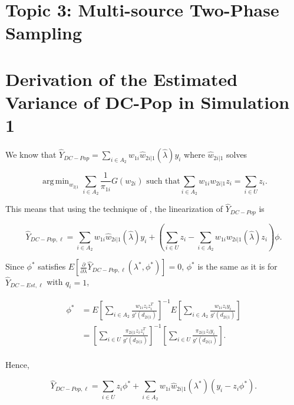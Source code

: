 \documentclass[12pt]{article}
\DeclareMathOperator*{\argmin}{arg\,min}
\begin{document}
\section{Topic 3: Multi-source Two-Phase Sampling}

\newpage 




\newpage

\appendix

\section{Derivation of the Estimated Variance of DC-Pop in Simulation 1}

We know that $\hat Y_{DC-Pop} = \sum_{i \in A_2} w_{1i} \hat w_{2i|1}(\hat
\lambda) y_i$ where $\hat w_{2i|1}$ solves

  \begin{equation}
    \argmin_{w_{2|1}} \sum_{i \in A_2} \frac{1}{\pi_{1i}} G(w_{2i})
    \text{ such that}
    \sum_{i \in A_2} w_{1i} w_{2i|1} z_i = \sum_{i \in U} z_i.
  \end{equation}

This means that using the technique of \cite{randles1982asymptotic},
the linearization of $\hat Y_{DC-Pop}$ is 

$$\hat Y_{DC-Pop, \ell} = \sum_{i \in A_2} w_{1i} \hat w_{2i|1}(\hat \lambda) y_i + 
\left( \sum_{i \in U} z_i - 
\sum_{i \in A_2} w_{1i} w_{2i|1}(\hat \lambda) z_i \right) \phi.$$

Since $\phi^*$ satisfies $E\left[\frac{\partial}{\partial \lambda} \hat Y_{DC-Pop,
\ell}(\lambda^*, \phi^*)\right] = 0$, $\phi^*$ is the same as it is for $\hat Y_{DC-Est,
\ell}$ with $q_i = 1$,

  \begin{align*}
    \phi^*
    &= E\left[\sum_{i \in A_2} \frac{w_{1i}z_i z_i^T }{g'(d_{2i|1})}\right]^{-1}
    E\left[\sum_{i \in A_2} \frac{w_{1i}z_i y_i}{g'(d_{2i|1})}\right]\\
    &= \left[\sum_{i \in U} \frac{\pi_{2i|1}z_i z_i^T}{g'(d_{2i|1})}\right]^{-1}
    \left[\sum_{i \in U} \frac{\pi_{2i|1} z_i y_i}{g'(d_{2i|1})}\right].\\
  \end{align*}

Hence,

$$
\hat Y_{DC-Pop, \ell} = \sum_{i \in U} z_i \phi^* + \sum_{i \in A_2} w_{1i} \hat
w_{2i|1}(\lambda^*) (y_i - z_i \phi^*).
$$
\end{document}
